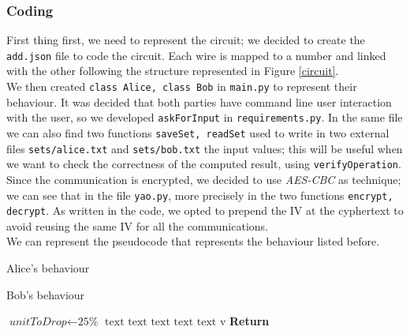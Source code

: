 \documentclass[12pt]{article}
\newcommand{\inlinecode}{\texttt}
\begin{document}
\subsubsection{Coding}
First thing first, we need to represent the circuit; we decided to create the \inlinecode{add.json} file to code the circuit. Each wire is mapped to a number and linked with the other following the structure represented in Figure \ref{circuit}.\\
We then created \inlinecode{class Alice, class Bob} in \inlinecode{main.py} to represent their behaviour.
It was decided that both parties have command line user interaction with the user, so we developed \inlinecode{askForInput} in \inlinecode{requirements.py}. In the same file we can also find two functions \inlinecode{saveSet, readSet} used to write in two external files \inlinecode{sets/alice.txt} and \inlinecode{sets/bob.txt} the input values; this will be useful when we want to check the correctness of the computed result, using \inlinecode{verifyOperation}.\\
Since the communication is encrypted, we decided to use \textit{AES-CBC} as technique; we can see that in the file \inlinecode{yao.py}, more precisely in the two functions \inlinecode{encrypt, decrypt}. As written in the code, we opted to prepend the IV at the cyphertext to avoid reusing the same IV for all the communications.\\
We can represent the pseudocode that represents the behaviour listed before.\\

\begin{minipage}{0.46\textwidth}
    \begin{algorithm}[H]
        \centering
        \caption{Alice's behaviour}\label{alice:algo}
        \begin{algorithmic}[1]
            \State {} 
        \end{algorithmic}
    \end{algorithm}
    \end{minipage}
    \hfill
    \begin{minipage}{0.46\textwidth}
    \begin{algorithm}[H]
        \centering
        \caption{Bob's behaviour}\label{bob:algo}
        \begin{algorithmic}[1]
            \State {} 
            \State $\textit{unitToDrop} \gets \text{25\%}$
            \State {}
            \State {}
            \Repeat
            \State {}
            \State $\text{text}$ 
            \State $\text{text}$ 
            \State $\text{text}$ 
            \State {}
            \State $\text{text}$
            \EndFor
            \State {}
            \Repeat
            \State {}
            \State $\text{text}$ 
            \State $\text{v}$ 
            \EndFor
            \State \textbf{Return}  
        \end{algorithmic}
    \end{algorithm}
    \end{minipage}
\end{document}
